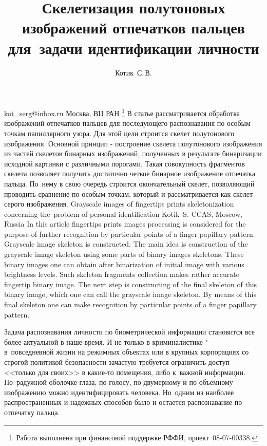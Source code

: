 \documentclass[twoside]{article}
\begin{document}
\title
    {Скелетизация полутоновых изображений отпечатков пальцев для~задачи идентификации личности}
\author
    {Котик~С.\,В.}
\email
    {kot\_serg@inbox.ru}
\organization
    {Москва, ВЦ РАН}
\thanks
    {Работа выполнена при финансовой поддержке РФФИ, проект \No\,08-07-00338.}
\abstract
    {В статье рассматривается обработка изображений отпечатков пальцев для последующего распознавания по особым точкам папиллярного узора. Для этой  цели строится скелет полутонового изображения. Основной принцип - построение скелета полутонового изображения из частей скелетов бинарных изображений, полученных в результате бинаризации исходной картинки с различными порогами. Такая совокупность фрагментов скелета позволяет получить достаточно четкое бинарное изображение отпечатка пальца. По~нему в свою очередь строится  окончательный скелет, позволяющий проводить сравнение по особым точкам, который и рассматривается как скелет серого изображения.}
\titleEng
    {Grayscale images of fingertips prints skeletonization concerning the~problem of personal identification}
\authorEng
    {Kotik~S.}
\organizationEng
    {CCAS, Moscow, Russia}
\abstractEng
    {In this article fingertips prints images processing is considered for the purpose of further recognition by particular points of a finger papillary pattern. Grayscale image skeleton is constructed. The main idea is construction of the grayscale image skeleton using some parts of binary images skeletons. These binary images one can obtain after binarization of initial image with various brightness levels. Such skeleton fragments collection makes rather accurate fingertip binary image. The next step is constructing of the final skeleton of this binary image, which one can call the grayscale image skeleton. By means of this final skeleton one can make recognition by particular points of a finger papillary pattern.}
\maketitle

Задача распознавания личности по биометрической информации становится все более актуальной в наше время. И не только в криминалистике "--- в~повседневной жизни на режимных объектах или в крупных корпорациях со строгой политикой безопасности зачастую требуется ограничить доступ <<только для своих>> в какие-то помещения, либо к~важной информации. По~радужной оболочке глаза, по голосу, по двумерному и по объемному изображению можно идентифицировать человека. Но~одним из наиболее распространенных и надежных способов было и остается  распознавание по отпечатку пальца.
\end{document}
